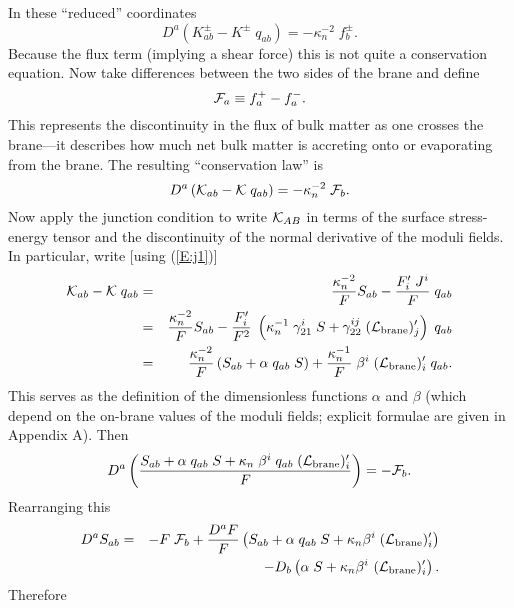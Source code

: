 \documentclass[a4paper,10pt]{article}
\begin{document}
{In these ``reduced'' coordinates
%
\begin{equation}
D^a \left(K_{ab}^\pm - K^\pm\; q_{ab}\right) = -\kappa_n^{-2} \; f_b^\pm.
\end{equation}
%
Because the flux term (implying a shear force) this is not quite a
conservation equation.  Now take differences between the two sides of
the brane and define
%
\begin{equation}
{\mathcal F}_a \equiv f^+_a - f^-_a.
\end{equation}
%
This represents the discontinuity in the flux of bulk matter as one
crosses the brane---it describes how much net bulk matter is accreting
onto or evaporating from the brane. The resulting ``conservation law''
is
%
\begin{equation}
D^a \left({\mathcal K}_{ab} - {\mathcal K}\; q_{ab}\right) = -\kappa_n^{-2} \; {\mathcal F}_b.
\end{equation}
%
Now apply the junction condition to write ${\mathcal K}_{AB}$ in terms of the
surface stress-energy tensor and the discontinuity of the normal
derivative of the moduli fields. In particular, write [using
(\ref{E:j1})]
%
\begin{eqnarray}
{\mathcal K}_{ab} - {\mathcal K}\; q_{ab} 
&=& 
{\kappa_n^{-2}\over F} S_{ab} - {F'_i \; J^i\over F} \; q_{ab}
\nonumber\\
&=&
{\kappa_n^{-2}\over F} S_{ab} 
- {F'_i \over F^2} \;  
\left( 
\kappa_n^{-1} \; \gamma_{21}^i \; S + \gamma_{22}^{ij} \; ({\mathcal L}_{\mathrm{brane}})'_j
\right) \; q_{ab}
\nonumber\\ 
&=&
{\kappa_n^{-2}\over F} 
\left( S_{ab} + \alpha \; q_{ab} \;S \right)
+{\kappa_n^{-1}\over F} \; \beta^i \; ({\mathcal L}_{\mathrm{brane}})'_i \; q_{ab}.
\end{eqnarray}
%
This serves as the definition of the dimensionless functions $\alpha$
and $\beta$ (which depend on the on-brane values of the moduli fields;
explicit formulae are given in Appendix A).  Then
%
\begin{equation}
D^a \left( 
{S_{ab} + \alpha\;q_{ab}\;S + \kappa_n \; \beta^i \; q_{ab} \; ({\mathcal L}_{\mathrm{brane}})'_i \over F} 
\right) = 
-{\mathcal F}_b.
\end{equation}
%
Rearranging this
%
\begin{eqnarray}
D^a S_{ab} &=& 
-F \; {\mathcal F}_b 
+ 
{D^a F\over F}  
\left( 
S_{ab} + \alpha\;q_{ab}\;S + \kappa_n \beta^i \; ({\mathcal L}_{\mathrm{brane}})'_i
\right)
\nonumber\\
&&-
D_b  \left( 
\alpha \;S + \kappa_n \beta^i \ ({\mathcal L}_{\mathrm{brane}})'_i 
\right).
\end{eqnarray}
%
Therefore
%
\begin{eqnarray}

\end{eqnarray}}
\end{document}
